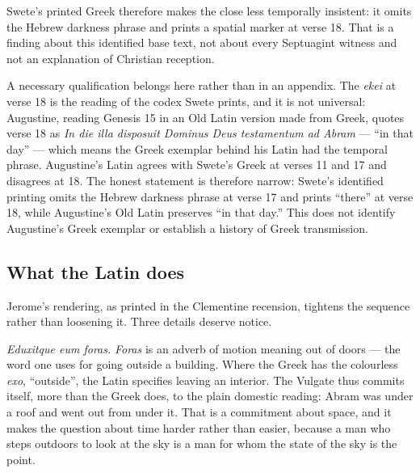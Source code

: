 Swete's printed Greek therefore makes the close less temporally insistent: it
omits the Hebrew darkness phrase and prints a spatial marker at verse 18. That
is a finding about this identified base text, not about every Septuagint
witness and not an explanation of Christian reception.

A necessary qualification belongs here rather than in an appendix. The
\textit{ekei} at verse 18 is the reading of the codex Swete prints, and it is
not universal: Augustine, reading Genesis 15 in an Old Latin version made from
Greek, quotes verse 18 as \textit{In die illa disposuit Dominus Deus testamentum
ad Abram} --- ``in that day'' --- which means the Greek exemplar behind his
Latin had the temporal phrase. Augustine's
Latin agrees with Swete's Greek at verses 11 and 17 and disagrees at 18. The
honest statement is therefore narrow: Swete's identified printing omits the
Hebrew darkness phrase at verse 17 and prints ``there'' at verse 18, while
Augustine's Old Latin preserves ``in that day.'' This does not identify
Augustine's Greek exemplar or establish a history of Greek transmission.

\subsection{What the Latin does}

Jerome's rendering, as printed in the Clementine recension, tightens the
sequence rather than loosening it. Three details deserve notice.

\textit{Eduxitque eum foras.} \textit{Foras} is an adverb of motion meaning
out of doors --- the word one uses for going outside a building. Where the
Greek has the colourless \textit{exo}, ``outside'', the Latin
specifies leaving an interior. The Vulgate thus commits itself, more than the
Greek does, to the plain domestic reading: Abram was under a roof and went out
from under it. That is a commitment about space, and it makes the question about
time harder rather than easier, because a man who steps outdoors to look at the
sky is a man for whom the state of the sky is the point.

